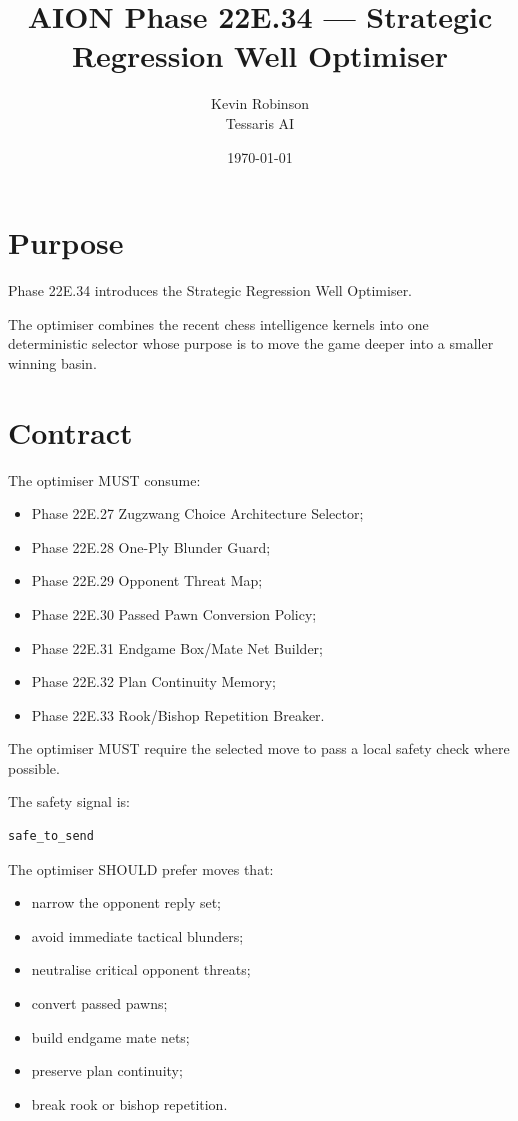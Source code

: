 \documentclass[11pt,a4paper]{article}
\title{\textbf{AION Phase 22E.34 --- Strategic Regression Well Optimiser}}
\author{Kevin Robinson\\Tessaris AI}
\date{\today}
\begin{document}
\maketitle

\section{Purpose}

Phase 22E.34 introduces the Strategic Regression Well Optimiser.

The optimiser combines the recent chess intelligence kernels into one deterministic selector whose purpose is to move the game deeper into a smaller winning basin.

\section{Contract}

The optimiser MUST consume:

\begin{itemize}[leftmargin=*]
  \item Phase 22E.27 Zugzwang Choice Architecture Selector;
  \item Phase 22E.28 One-Ply Blunder Guard;
  \item Phase 22E.29 Opponent Threat Map;
  \item Phase 22E.30 Passed Pawn Conversion Policy;
  \item Phase 22E.31 Endgame Box/Mate Net Builder;
  \item Phase 22E.32 Plan Continuity Memory;
  \item Phase 22E.33 Rook/Bishop Repetition Breaker.
\end{itemize}

The optimiser MUST require the selected move to pass a local safety check where possible.

The safety signal is:

\begin{verbatim}
safe_to_send
\end{verbatim}

The optimiser SHOULD prefer moves that:

\begin{itemize}[leftmargin=*]
  \item narrow the opponent reply set;
  \item avoid immediate tactical blunders;
  \item neutralise critical opponent threats;
  \item convert passed pawns;
  \item build endgame mate nets;
  \item preserve plan continuity;
  \item break rook or bishop repetition.
\end{itemize}
\end{document}
